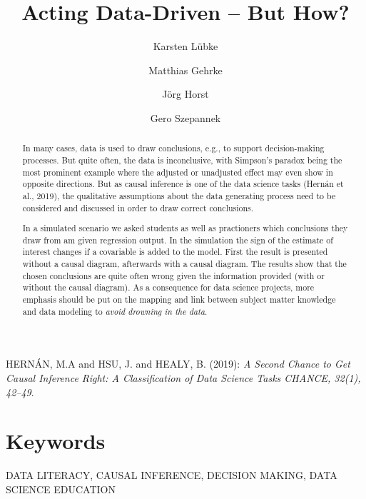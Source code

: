 \documentclass{svmult}
\begin{document}
\title*{Acting Data-Driven -- But How?}

\author{Karsten L\"{u}bke\and
Matthias Gehrke\and
J\"{o}rg Horst\and
Gero Szepannek}

\maketitle

\begin{abstract}
In many cases, data is used to draw conclusions, e.g., to support decision-making processes.
But quite often, the data is inconclusive, with Simpson's paradox being the most prominent example where the adjusted or unadjusted effect may even show in opposite directions.
But as causal inference is one of the data science tasks (Hern\'{a}n et al., 2019), the qualitative assumptions about the data generating process need to be considered and discussed in order to draw correct conclusions.

In a simulated scenario we asked students as well as practioners which conclusions they draw from am given regression output. In the simulation the sign of the estimate of interest changes if a covariable is added to the model.
First the result is presented without a causal diagram, afterwards with a causal diagram. 
The results show that the chosen conclusions are quite often wrong given the information provided (with or without the causal diagram). 
As a consequence for data science projects, more emphasis should be put on the mapping and link between subject matter knowledge and data modeling to {\em avoid drowning in the data}.


\end{abstract}

\begin{thebibliography}{1}

\item[]
HERN\'{A}N, M.A and HSU, J. and  HEALY, B. (2019): {\em A Second Chance to Get
Causal Inference Right: A Classification of Data Science Tasks CHANCE, 32(1), 42--49}. 

\end{thebibliography}

\section*{Keywords}
DATA LITERACY, CAUSAL INFERENCE, DECISION MAKING, DATA SCIENCE EDUCATION 
\end{document}
